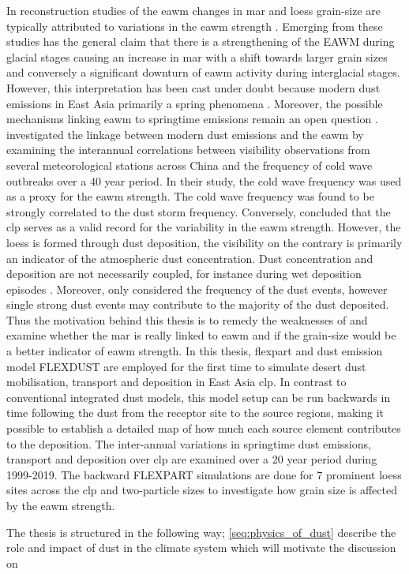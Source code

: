 In reconstruction studies of the \acrfull{eawm} changes in 
\acrfull{mar} and loess grain-size are typically attributed to variations in the \acrshort{eawm} strength \parencite{stevens2007reinterpreting}. Emerging from these studies has the general claim that there is a strengthening of the EAWM during glacial stages causing an increase in \acrshort{mar} with a shift towards larger grain sizes and conversely a significant downturn of \acrshort{eawm} activity during interglacial stages.
However, this interpretation has been cast under doubt because modern dust emissions in East Asia primarily a spring phenomena \parencite{sun2001spatial}.
Moreover, the possible mechanisms linking \acrshort{eawm} to springtime emissions remain an open question \parencite{roe2009interpretation}. 
\textcite{wyrwoll2016cold} investigated the linkage between modern dust emissions and the \acrshort{eawm} by examining the interannual correlations between visibility observations from several meteorological stations across China and the frequency of cold wave outbreaks over a 40 year period. In their study, the cold wave frequency was used as a proxy for the \acrshort{eawm} strength. 
The cold wave frequency was found to be strongly correlated to the dust storm frequency.
Conversely, \textcite{wyrwoll2016cold} concluded that the \acrshort{clp} serves as a valid record for the variability in the \acrshort{eawm} strength. However, the loess is formed through dust deposition, the visibility on the contrary is primarily an indicator of the atmospheric dust concentration. Dust concentration and deposition are not necessarily coupled, for instance during wet deposition episodes . Moreover, \textcite{wyrwoll2016cold} only considered the frequency of the dust events, however single strong dust events may contribute to the majority of the dust deposited. Thus the motivation behind this thesis is to remedy the weaknesses of \textcite{wyrwoll2016cold} and examine whether the \acrshort{mar} is really linked to \acrshort{eawm} and if the grain-size would be a better indicator of \acrshort{eawm} strength. 
In this thesis, \acrfull{flexpart} \parencite{Flexpart10.4_ref} and dust emission model FLEXDUST \parencite{flexdust_ref_2016} are employed for the first time to simulate desert dust mobilisation, transport and deposition in East Asia \acrshort{clp}. In contrast to conventional integrated dust models, this model setup can be run backwards in time following the dust from the receptor site to the source regions, making it possible to establish a detailed map of how much each source element contributes to the deposition. The inter-annual variations in springtime dust emissions, transport and deposition over \acrshort{clp} are examined over a 20 year period during 1999-2019. The backward FLEXPART simulations are done for 7 prominent loess sites across the \acrshort{clp} and two-particle sizes to investigate how grain size is affected by the \acrshort{eawm} strength. 

The thesis is structured in the following way; \cref{seq:physics_of_dust} describe the role and impact of dust in the climate system which will motivate the discussion on
 

